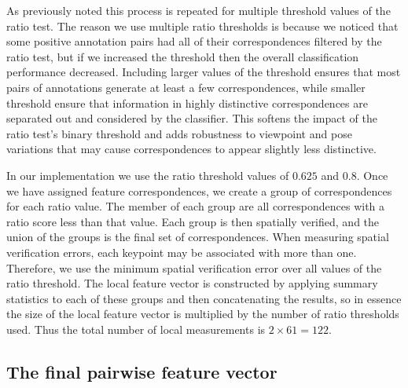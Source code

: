 As previously noted this process is repeated for multiple threshold values of the ratio test.
The reason we use multiple ratio thresholds is because we noticed that some positive annotation pairs had all of
  their correspondences filtered by the ratio test, but if we increased the threshold then the overall
  classification performance decreased.
Including larger values of the threshold ensures that most pairs of annotations generate at least a few
  correspondences, while smaller threshold ensure that information in highly distinctive correspondences are
  separated out and considered by the classifier.
This softens the impact of the ratio test's binary threshold and adds robustness to viewpoint and pose variations
  that may cause correspondences to appear slightly less distinctive.

In our implementation we use the ratio threshold values of $0.625$ and $0.8$.
Once we have assigned feature correspondences, we create a group of correspondences for each ratio value.
The member of each group are all correspondences with a ratio score less than that value.
Each group is then spatially verified, and the union of the groups is the final set of correspondences.
When measuring spatial verification errors, each keypoint may be associated with more than one.
Therefore, we use the minimum spatial verification error over all values of the ratio threshold.
The local feature vector is constructed by applying summary statistics to each of these groups and then
  concatenating the results, so in essence the size of the local feature vector is multiplied by the number of
  ratio thresholds used.
Thus the total number of local measurements is $2 \times 61 = 122$.


\FloatBarrier{}
\subsection{The final pairwise feature vector}

